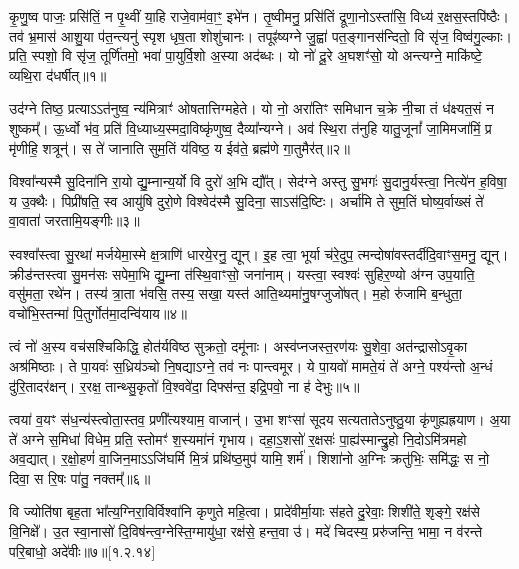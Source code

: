 
कृ॒णु॒ष्व पाजः॒ प्रसि॑तिं॒ न पृ॒थ्वीं या॒हि राजे॒वाम॑वा॒ꣳ॒ इभे॑न। तृ॒ष्वीमनु॒ प्रसि॑तिं द्रूणा॒नोऽस्ता॑सि॒ विध्य॑ र॒क्षस॒स्तपि॑ष्ठैः। तव॑ भ्र॒मास॑ आशु॒या प॑त॒न्त्यनु॑ स्पृश धृष॒ता शोशु॑चानः। तपूꣴ॑ष्यग्ने जु॒ह्वा॑ पत॒ङ्गानस॑न्दितो॒ वि सृ॑ज॒ विष्व॑गु॒ल्काः। प्रति॒ स्पशो॒ वि सृ॑ज॒ तूर्णि॑तमो॒ भवा॑ पा॒युर्वि॒शो अ॒स्या अद॑ब्धः। यो नो॑ दू॒रे अ॒घशꣳ॑सो॒  यो अन्त्यग्ने॒ माकि॑ष्टे॒ व्यथि॒रा द॑धर्षीत्॥१॥

उद॑ग्ने तिष्ठ॒ प्रत्याऽऽत॑नुष्व॒ न्य॑मित्राꣳ॑ ओषतात्तिग्महेते। यो नो॒ अरा॑तिꣳ समिधान च॒क्रे नी॒चा तं ध॑क्ष्यत॒सं न शुष्कम्᳚। ऊ॒र्ध्वो भ॑व॒ प्रति॑ वि॒ध्याध्य॒स्मदा॒विष्कृ॑णुष्व॒ दैव्या᳚न्यग्ने। अव॑ स्थि॒रा त॑नुहि यातु॒जूनां᳚ जा॒मिमजा॑मिं॒ प्र मृ॑णीहि॒ शत्रून्॑। स ते॑ जानाति सुम॒तिं य॑विष्ठ॒ य ईव॑ते॒ ब्रह्म॑णे गा॒तुमैर॑त्॥२॥

विश्वा᳚न्यस्मै सु॒दिना॑नि रा॒यो द्यु॒म्नान्य॒र्यो वि दुरो॑ अ॒भि द्यौ᳚त्। सेद॑ग्ने अस्तु सु॒भगः॑ सु॒दानु॒र्यस्त्वा॒ नित्ये॑न ह॒विषा॒ य उ॒क्थैः। पिप्री॑षति॒ स्व आयु॑षि दुरो॒णे विश्वेद॑स्मै सु॒दिना॒ साऽस॑दि॒ष्टिः। अर्चा॑मि ते सुम॒तिं घोष्य॒र्वाख्सं ते॑ वा॒वाता॑ जरतामि॒यङ्गीः॥३॥
 
स्वश्वा᳚स्त्वा सु॒रथा॑ मर्जयेमा॒स्मे क्ष॒त्राणि॑ धारये॒रनु॒ द्यून्। इ॒ह त्वा॒ भूर्या च॑रे॒दुप॒ त्मन्दोषा॑\-वस्तर्दीदि॒वाꣳ\-स॒मनु॒ द्यून्। क्रीड॑न्तस्त्वा सु॒मन॑सः सपेमा॒भि द्यु॒म्ना त॑स्थि॒वाꣳसो॒ जना॑नाम्। यस्त्वा॒ स्वश्वः॑ सुहिर॒ण्यो अ॑ग्न उप॒याति॒ वसु॑मता॒ रथे॑न। तस्य॑ त्रा॒ता भ॑वसि॒ तस्य॒ सखा॒ यस्त॑ आति॒थ्यमा॑नु॒षग्जुजो॑षत्। म॒हो रु॑जामि ब॒न्धुता॒ वचो॑भि॒स्तन्मा॑ पि॒तुर्गोत॑मा॒दन्वि॑याय॥४॥

त्वं नो॑ अ॒स्य वच॑सश्चिकिद्धि॒ होत॑र्यविष्ठ सुक्रतो॒ दमू॑नाः। अस्व॑प्नजस्त॒रण॑यः सु॒शेवा॒ अत॑न्द्रासोऽवृ॒का अश्र॑मिष्ठाः। ते पा॒यवः॑ स॒ध्रिय॑ञ्चो नि॒षद्याऽग्ने॒ तव॑ नः पान्त्वमूर। ये पा॒यवो॑ मामते॒यं ते॑ अग्ने॒ पश्य॑न्तो अ॒न्धं दु॑रि॒तादर॑क्षन्। र॒रक्ष॒ तान्थ्सु॒कृतो॑ वि॒श्ववे॑दा॒ दिफ्स॑न्त॒ इद्रि॒पवो॒ ना ह॑ देभुः॥५॥
 
त्वया॑ व॒यꣳ स॑ध॒न्य॑स्त्वोता॒स्तव॒ प्रणी᳚त्यश्याम॒ वाजान्॑। उ॒भा शꣳसा॑ सूदय सत्यतातेऽनुष्ठु॒या कृ॑णुह्यह्रयाण। अ॒या ते॑ अग्ने स॒मिधा॑ विधेम॒ प्रति॒ स्तोमꣳ॑ श॒स्यमा॑नं गृभाय। दहा॒ऽ॒शसो॑ र॒क्षसः॑ पा॒ह्य॑स्मान्द्रु॒हो नि॒दोऽमि॑त्रमहो अव॒द्यात्। र॒क्षो॒हणं॑ वा॒जिन॒माऽऽजि॑घर्मि मि॒त्रं प्रथि॑ष्ठ॒मुप॑ यामि॒ शर्म॑। शिशा॑नो अ॒ग्निः क्रतु॑भिः॒ समि॑द्धः॒ स नो॒ दिवा॒ स रि॒षः पा॑तु॒ नक्तम्᳚॥६॥

 वि ज्योति॑षा बृह॒ता भा᳚त्य॒ग्निरा॒विर्विश्वा॑नि कृणुते महि॒त्वा। प्रादे॑वीर्मा॒याः स॑हते दु॒रेवाः॒ शिशी॑ते॒ शृङ्गे॒ रक्ष॑से वि॒निक्षे᳚। उ॒त स्वा॒नासो॑ दि॒विष॑न्त्व॒ग्नेस्ति॒ग्मायु॑धा॒ रक्ष॑से॒ हन्त॒वा उ॑। मदे॑ चिदस्य॒ प्ररु॑जन्ति॒ भामा॒ न व॑रन्ते परि॒बाधो॒ अदे॑वीः॥७॥[१.२.१४]

